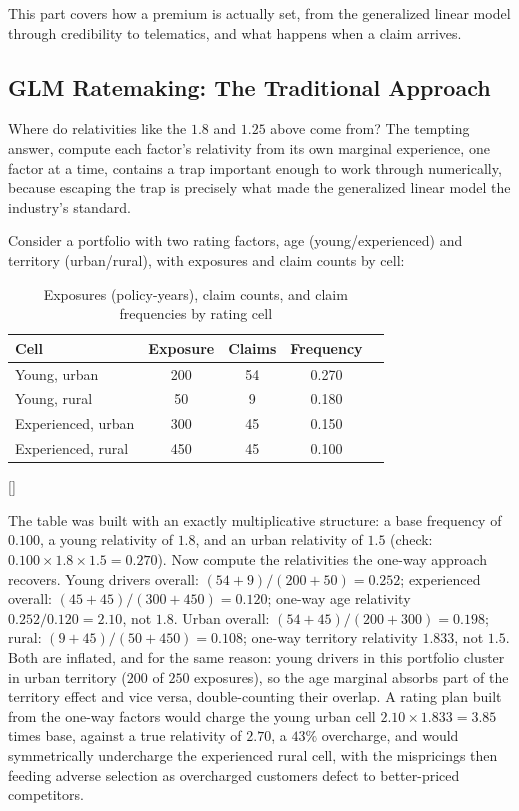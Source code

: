 \documentclass[../ai_in_finance]{subfiles}
\begin{document}
This part covers how a premium is actually set, from the generalized linear model through credibility to telematics, and what happens when a claim arrives.

\subsection{GLM Ratemaking: The Traditional Approach}
\label{sec:ins-glm}

Where do relativities like the $1.8$ and $1.25$ above come from? The tempting answer, compute each factor's relativity from its own marginal experience, one factor at a time, contains a trap important enough to work through numerically, because escaping the trap is precisely what made the generalized linear model the industry's standard.

Consider a portfolio with two rating factors, age (young/experienced) and territory (urban/rural), with exposures and claim counts by cell:

\begin{table}[htbp]
\centering
\begin{lrbox}{\bookmeasuredbox}
\begin{tabular}{lcccc}
\toprule
Cell & Exposure & Claims & Frequency \\
\midrule
Young, urban & 200 & 54 & 0.270 \\
Young, rural & 50 & 9 & 0.180 \\
Experienced, urban & 300 & 45 & 0.150 \\
Experienced, rural & 450 & 45 & 0.100 \\
\bottomrule
\end{tabular}
\end{lrbox}
\ifdim\wd\bookmeasuredbox<0.65\linewidth
\setlength{\bookcapwidth}{0.65\linewidth}
\else
\setlength{\bookcapwidth}{\wd\bookmeasuredbox}
\fi
{}[\bookcapwidth]{
\usebox{\bookmeasuredbox}
}{
\caption{Exposures (policy-years), claim counts, and claim frequencies by rating cell}
\label{tab:ins-oneway}
}
\end{table}

The table was built with an exactly multiplicative structure: a base frequency of $0.100$, a young relativity of $1.8$, and an urban relativity of $1.5$ (check: $0.100 \times 1.8 \times 1.5 = 0.270$). Now compute the relativities the one-way approach recovers. Young drivers overall: $(54+9)/(200+50) = 0.252$; experienced overall: $(45+45)/(300+450) = 0.120$; one-way age relativity $0.252/0.120 = 2.10$, not $1.8$. Urban overall: $(54+45)/(200+300) = 0.198$; rural: $(9+45)/(50+450) = 0.108$; one-way territory relativity $1.833$, not $1.5$. Both are inflated, and for the same reason: young drivers in this portfolio cluster in urban territory ($200$ of $250$ exposures), so the age marginal absorbs part of the territory effect and vice versa, double-counting their overlap. A rating plan built from the one-way factors would charge the young urban cell $2.10 \times 1.833 = 3.85$ times base, against a true relativity of $2.70$, a $43\%$ overcharge, and would symmetrically undercharge the experienced rural cell, with the mispricings then feeding adverse selection as overcharged customers defect to better-priced competitors.
\end{document}

